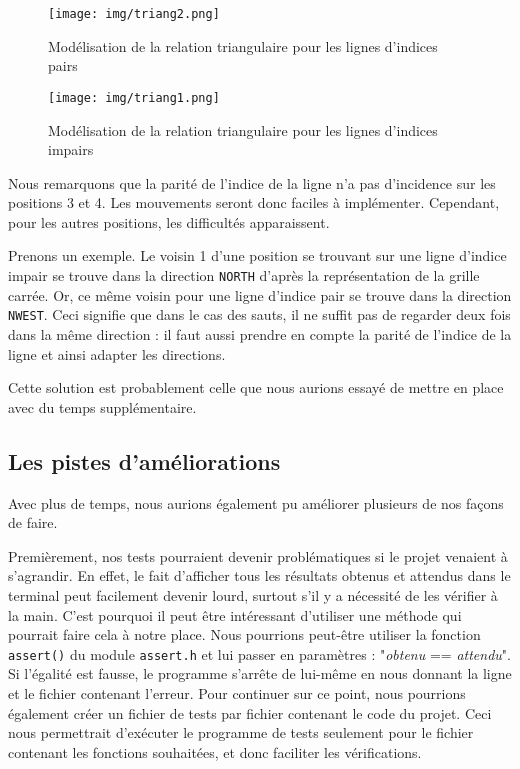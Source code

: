 \documentclass[a4paper]{article}
\begin{document}
\begin{center}
\begin{figure}[H]

    \texttt{[image: img/triang2.png]}
    \caption{Modélisation de la relation triangulaire pour les lignes d'indices pairs}
    \label{fig:triangle pair}
    
    \texttt{[image: img/triang1.png]}
    \caption{Modélisation de la relation triangulaire pour les lignes d'indices impairs}
    \label{fig:triangle impair}
    
\end{figure}
\end{center}

Nous remarquons que la parité de l'indice de la ligne n'a pas d'incidence sur les positions 3 et 4. Les mouvements seront donc faciles à implémenter. Cependant, pour les autres positions, les difficultés apparaissent.

Prenons un exemple. Le voisin 1 d'une position se trouvant sur une ligne d'indice impair se trouve dans la direction \verb|NORTH| d'après la représentation de la grille carrée. Or, ce même voisin pour une ligne d'indice pair se trouve dans la direction \verb|NWEST|. Ceci signifie que dans le cas des sauts, il ne suffit pas de regarder deux fois dans la même direction : il faut aussi prendre en compte la parité de l'indice de la ligne et ainsi adapter les directions.

Cette solution est probablement celle que nous aurions essayé de mettre en place avec du temps supplémentaire.

\subsection{Les pistes d'améliorations}
\label{amélio}

Avec plus de temps, nous aurions également pu améliorer plusieurs de nos façons de faire.

Premièrement, nos tests pourraient devenir problématiques si le projet venaient à s'agrandir. En effet, le fait d'afficher tous les résultats obtenus et attendus dans le terminal peut facilement devenir lourd, surtout s'il y a nécessité de les vérifier à la main. C'est pourquoi il peut être intéressant d'utiliser une méthode qui pourrait faire cela à notre place. Nous pourrions peut-être utiliser la fonction \verb|assert()| du module \verb|assert.h| et lui passer en paramètres : "\emph{obtenu} == \emph{attendu}". Si l'égalité est fausse, le programme s'arrête de lui-même en nous donnant la ligne et le fichier contenant l'erreur. Pour continuer sur ce point, nous pourrions également créer un fichier de tests par fichier contenant le code du projet. Ceci nous permettrait d'exécuter le programme de tests seulement pour le fichier contenant les fonctions souhaitées, et donc faciliter les vérifications.
\end{document}
